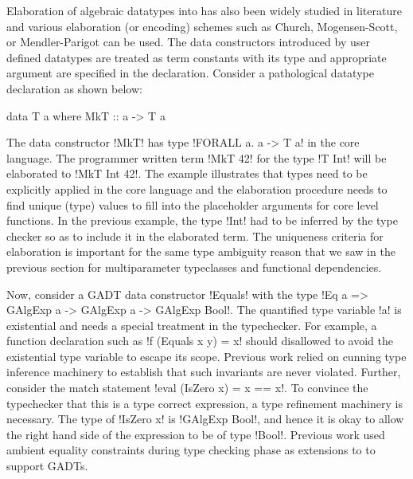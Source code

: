 \documentclass[screen,nonacm]{acmart}
\begin{document}
Elaboration of algebraic datatypes into \SF has also been widely
studied in literature and various elaboration (or encoding) schemes
such as Church\cite{jansen_efficient_2005,jansen_programming_2013},
Mogensen-Scott\cite{mogensen_efficient_1992}, or Mendler-Parigot
\cite{parigot_representation_1990, stump_efficiency_2016} can be used.
The data constructors introduced by user defined datatypes are treated as
term constants with its type and appropriate argument are specified in
the declaration. Consider a pathological datatype declaration as shown
below:

\begin{CenteredBox}
\begin{code}
  data T a where MkT :: a -> T a
\end{code}
\end{CenteredBox}

The data constructor !MkT! has type !FORALL a. a -> T a! in the
core language. The programmer written term !MkT 42! for the type
!T Int! will be elaborated to !MkT Int 42!. The example illustrates
that types need to be explicitly applied in the core language and the
elaboration procedure needs to find unique (type) values to fill into the
placeholder arguments for core level functions. In the previous
example, the type !Int! had to be inferred by the type checker so as
to include it in the elaborated term. The uniqueness criteria for
elaboration is important for the same type ambiguity reason that we saw
in the previous section for multiparameter typeclasses and functional
dependencies.

Now, consider a GADT data constructor !Equals! with the type
!Eq a => GAlgExp a -> GAlgExp a -> GAlgExp Bool!. The
quantified type variable !a! is existential and needs a special
treatment in the typechecker. For example, a function declaration such
as !f (Equals x y) = x! should disallowed to avoid the
existential type variable to escape its scope. Previous work relied on
cunning type inference machinery to establish that such
invariants are never violated. Further, consider the match statement
!eval (IsZero x) = x == x!. To convince the typechecker that this is a
type correct expression, a type refinement machinery is necessary. The
type of !IsZero x! is !GAlgExp Bool!, and hence it is okay to allow
the right hand side of the expression to be of type !Bool!. Previous
work\cite{cheney_first-class_2003,xi_guarded_2003,peyton_jones_simple_2006}
used ambient equality constraints during type checking phase as
extensions to \SF to support GADTs.
\end{document}
